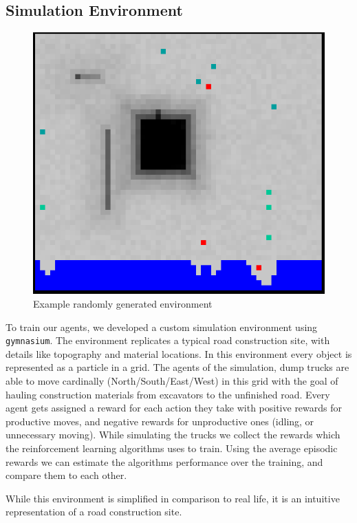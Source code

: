 \documentclass[conference]{IEEEtran}
\begin{document}
	\subsection{Simulation Environment}
  \begin{figure}[!ht]
		\includegraphics[width=\columnwidth]{graphs/example_env.png}
		\caption{Example randomly generated environment}
		\label{fig:environment}
	\end{figure}

	To train our agents, we developed a custom simulation environment using \texttt{gymnasium}. The environment replicates a typical road construction site, with details like topography and material locations. In this environment every object is represented as a particle in a grid.
	The agents of the simulation, dump trucks are able to move cardinally (North/South/East/West) in this grid with the goal of hauling construction materials from excavators to the unfinished road.
	Every agent gets assigned a reward for each action they take with positive rewards for productive moves, and negative rewards for unproductive ones (idling, or unnecessary moving).
	While simulating the trucks we collect the rewards which the reinforcement learning algorithms uses to train.
	Using the average episodic rewards we can estimate the algorithms performance over the training, and compare them to each other.

	While this environment is simplified in comparison to real life, it is an intuitive representation of a road construction site.
\end{document}
